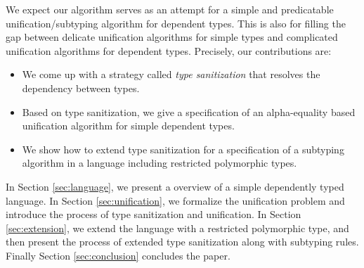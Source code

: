 We expect our algorithm serves as an attempt
for a simple and predicatable unification/subtyping algorithm for dependent
types. This is also for
filling the gap between
delicate unification algorithms for simple types
and
complicated unification algorithms for dependent types.
Precisely, our contributions are:

\begin{itemize}
  \item We come up with a strategy called \textit{type sanitization}
    that resolves the
    dependency between types.
  \item Based on type sanitization, we give a specification of an alpha-equality
    based unification algorithm
    for simple dependent types.
  \item We show how to extend type sanitization for a specification of a
    subtyping algorithm
    in a language including restricted polymorphic types.
\end{itemize}

In Section \ref{sec:language}, we present a overview of a simple dependently
typed language.
In Section \ref{sec:unification}, we formalize the unification
problem and introduce the process of type sanitization and unification. In
Section \ref{sec:extension}, we extend the language with a restricted
polymorphic type, and then present the process of extended type sanitization
along with subtyping rules. Finally Section \ref{sec:conclusion} concludes the
paper.